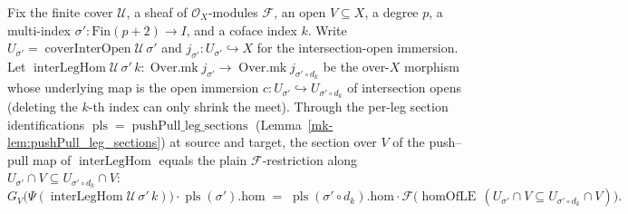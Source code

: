 \begin{lemma}
  \label{mk-lem:pushPull_interLegHom_sections}

  Fix the finite cover \(\mathcal{U}\), a sheaf of \(\mathcal{O}_X\)-modules \(\mathcal{F}\), an
  open \(V \subseteq X\), a degree \(p\), a multi-index \(\sigma' : \mathrm{Fin}(p+2) \to I\), and a
  coface index \(k\). Write \(U_{\sigma'} = \operatorname{coverInterOpen}\mathcal{U}\,\sigma'\) and
  \(j_{\sigma'} : U_{\sigma'} \hookrightarrow X\) for the intersection-open immersion. Let
  \(\operatorname{interLegHom}\mathcal{U}\,\sigma'\,k : \operatorname{Over.mk} j_{\sigma'} \to
  \operatorname{Over.mk} j_{\sigma' \circ d_k}\) be the over-\(X\) morphism whose underlying map is
  the open immersion \(c : U_{\sigma'} \hookrightarrow U_{\sigma' \circ d_k}\) of intersection opens
  (deleting the \(k\)-th index can only shrink the meet). Through the per-leg section
  identifications \(\operatorname{pls} = \operatorname{pushPull\_leg\_sections}\)
  (Lemma~\ref{mk-lem:pushPull_leg_sections}) at source and target, the section over \(V\) of the
  push--pull map of \(\operatorname{interLegHom}\) equals the plain \(\mathcal{F}\)-restriction along
  \(U_{\sigma'} \cap V \subseteq U_{\sigma' \circ d_k} \cap V\):
  \[
    G_V\bigl(\Psi(\operatorname{interLegHom}\mathcal{U}\,\sigma'\,k)\bigr)\cdot
      \operatorname{pls}(\sigma').\mathrm{hom}
      \;=\;
    \operatorname{pls}(\sigma' \circ d_k).\mathrm{hom}\cdot
      \mathcal{F}\bigl(\operatorname{homOfLE}\,(U_{\sigma'} \cap V \subseteq
        U_{\sigma' \circ d_k} \cap V)\bigr).
  \]
\end{lemma}
